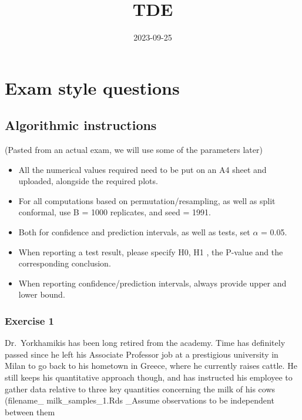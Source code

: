 \documentclass[
]{article}
\title{TDE}
\author{}
\date{\vspace{-2.5em}2023-09-25}
\providecommand{\tightlist}{%
  \setlength{\itemsep}{0pt}\setlength{\parskip}{0pt}}
\begin{document}
\maketitle

\hypertarget{exam-style-questions}{%
\section{Exam style questions}\label{exam-style-questions}}

\hypertarget{algorithmic-instructions}{%
\subsection{Algorithmic instructions}\label{algorithmic-instructions}}

(Pasted from an actual exam, we will use some of the parameters later)

\begin{itemize}
\tightlist
\item
  All the numerical values required need to be put on an A4 sheet and
  uploaded, alongside the required plots.
\item
  For all computations based on permutation/resampling, as well as split
  conformal, use B = 1000 replicates, and seed = 1991.
\item
  Both for confidence and prediction intervals, as well as tests, set
  \(\alpha\) = 0.05.
\item
  When reporting a test result, please specify H0, H1 , the P-value and
  the corresponding conclusion.
\item
  When reporting confidence/prediction intervals, always provide upper
  and lower bound.
\end{itemize}

\hypertarget{exercise-1}{%
\subsubsection{Exercise 1}\label{exercise-1}}

Dr.~Yorkhamikis has been long retired from the academy. Time has
definitely passed since he left his Associate Professor job at a
prestigious university in Milan to go back to his hometown in Greece,
where he currently raises cattle. He still keeps his quantitative
approach though, and has instructed his employee to gather data relative
to three key quantities concerning the milk of his cows (filename\_
milk\_samples\_1.Rds \_Assume observations to be independent between
them
\end{document}
